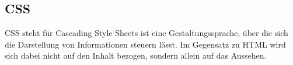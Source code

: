 \subsection{CSS}
CSS steht für Cascading Style Sheets ist eine Gestaltungssprache, über die sich die Darstellung von Informationen steuern lässt. Im Gegensatz zu HTML wird sich dabei nicht auf den Inhalt bezogen, sondern allein auf das Aussehen.
